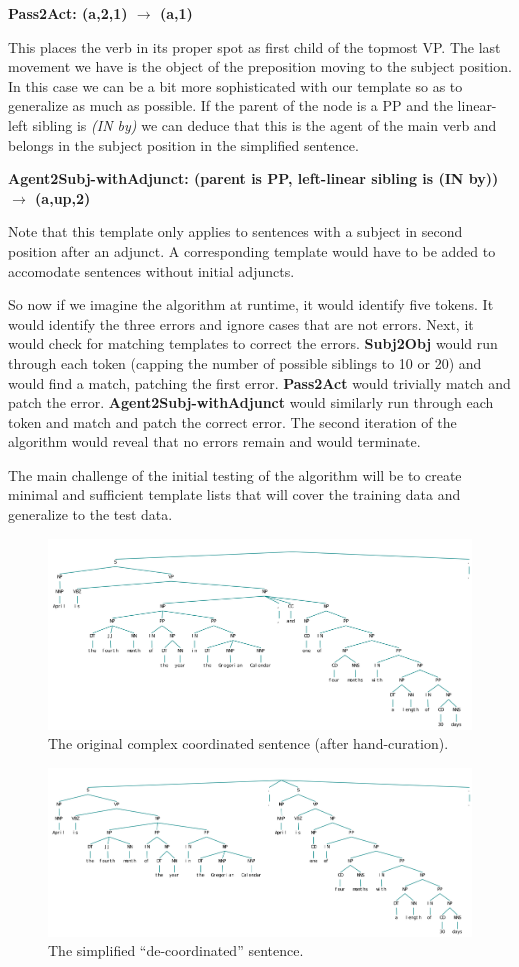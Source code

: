 \documentclass{article}
\begin{document}
\begin{center}
\textbf{Pass2Act: (a,2,1) $\rightarrow$ (a,1)}
\end{center}

This places the verb in its proper spot as first child of the topmost VP. The last movement we have is the object of the preposition moving to the subject position. In this case we can be a bit more sophisticated with our template so as to generalize as much as possible. If the parent of the node is a PP and the linear-left sibling is \textit{(IN by)} we can deduce that this is the agent of the main verb and belongs in the subject position in the simplified sentence.

\begin{center}
\textbf{Agent2Subj-withAdjunct: (parent is PP, left-linear sibling is (IN by)) $\rightarrow$ (a,up,2)}
\end{center}

Note that this template only applies to sentences with a subject in second position after an adjunct. A corresponding template would have to be added to accomodate sentences without initial adjuncts.

So now if we imagine the algorithm at runtime, it would identify five tokens. It would identify the three errors and ignore cases that are not errors. Next, it would check for matching templates to correct the errors. \textbf{Subj2Obj} would run through each token (capping the number of possible siblings to 10 or 20) and would find a match, patching the first error. \textbf{Pass2Act} would trivially match and patch the error. \textbf{Agent2Subj-withAdjunct} would similarly run through each token and match and patch the correct error. The second iteration of the algorithm would reveal that no errors remain and would terminate.

The main challenge of the initial testing of the algorithm will be to create minimal and sufficient template lists that will cover the training data and generalize to the test data.

\begin{figure}
\includegraphics[scale=.45]{coord_tree}
\caption{The original complex coordinated sentence (after hand-curation).}
\end{figure}

\begin{figure}
\includegraphics[scale=.41]{simp_coord}
\caption{The simplified ``de-coordinated'' sentence.}
\end{figure}
\end{document}
